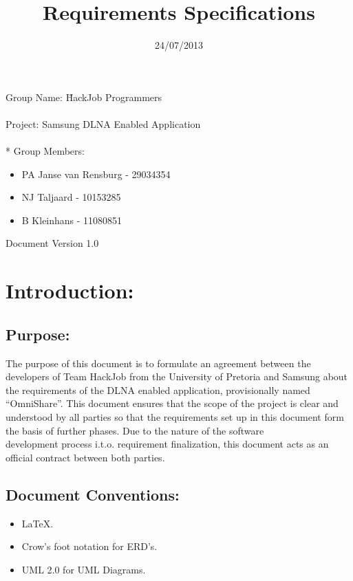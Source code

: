 \documentclass[12pt]{article}
\title{Requirements Specifications}
\date{24/07/2013}
\begin{document}
  \maketitle
\begin{tabbing}
Group Name: \= HackJob Programmers
\\~
\\Project: Samsung DLNA Enabled Application
\\~
  \\* Group Members:
\end{tabbing}
	
	\begin{itemize}
	\item PA Janse van Rensburg - 29034354
	\item NJ Taljaard - 10153285
	\item B Kleinhans - 11080851
	\end{itemize}

Document Version 1.0

\newpage
\section{Introduction:}
\subsection{Purpose:}

The purpose of this document is to formulate an agreement between the developers of Team HackJob from the University of Pretoria and Samsung about the requirements of the DLNA enabled application, provisionally named “OmniShare”.  This document ensures that the scope of the project is clear and understood by all parties so that the requirements set up in this document form the basis of further phases. Due to the nature of the software
\\ development process i.t.o. requirement finalization, this document acts as an official contract between both parties.

\subsection{Document Conventions:}
\begin{itemize}
\item LaTeX.
\item Crow's foot notation for ERD's.
\item UML 2.0 for UML Diagrams.
\end{itemize}
\end{document}
